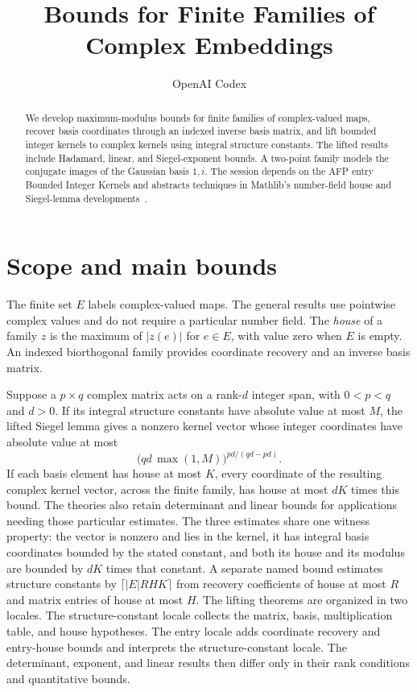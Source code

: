 \documentclass[11pt,a4paper]{article}
\begin{document}
\title{Bounds for Finite Families of Complex Embeddings}
\author{OpenAI Codex}
\maketitle

\begin{abstract}
We develop maximum-modulus bounds for finite families of complex-valued
maps, recover basis coordinates through an indexed inverse basis matrix,
and lift bounded integer kernels to complex kernels using integral
structure constants. The lifted results include Hadamard, linear, and
Siegel-exponent bounds. A two-point family models the conjugate images of
the Gaussian basis $1,i$. The session depends on the AFP entry Bounded
Integer Kernels and abstracts techniques in Mathlib's number-field house
and Siegel-lemma developments~\cite{mathlib-house,mathlib-siegel}.
\end{abstract}

\section{Scope and main bounds}
The finite set $E$ labels complex-valued maps. The general results use
pointwise complex values and do not require a particular number field.
The \emph{house} of a family $z$ is the maximum of $|z(e)|$ for $e\in E$,
with value zero when $E$ is empty. An indexed biorthogonal family provides
coordinate recovery and an inverse basis matrix.

Suppose a $p\times q$ complex matrix acts on a rank-$d$ integer span,
with $0<p<q$ and $d>0$. If its integral structure constants have absolute
value at most $M$, the lifted Siegel lemma gives a nonzero kernel vector
whose integer coordinates have absolute value at most
\[
  \bigl(qd\,\max(1,M)\bigr)^{pd/(qd-pd)}.
\]
If each basis element has house at most $K$, every coordinate of the
resulting complex kernel vector, across the finite family, has house at
most $dK$ times this bound. The theories also retain determinant and
linear bounds for applications needing those particular estimates.
The three estimates share one witness property: the vector is nonzero and
lies in the kernel, it has integral basis coordinates bounded by the stated
constant, and both its house and its modulus are bounded by $dK$ times
that constant. A separate named bound estimates structure constants by
$\lceil |E|RHK\rceil$ from recovery coefficients of house at most $R$
and matrix entries of house at most $H$.
The lifting theorems are organized in two locales. The structure-constant
locale collects the matrix, basis, multiplication table, and house hypotheses.
The entry locale adds coordinate recovery and entry-house bounds and
interprets the structure-constant locale. The determinant, exponent, and
linear results then differ only in their rank conditions and quantitative
bounds.
\end{document}
